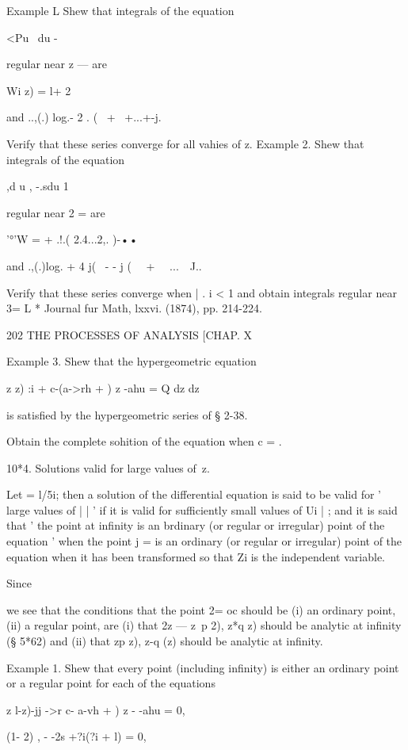 Example L Shew that integrals of the equation

<Pu \ du -

regular near z — are

Wi z) = l+ 2



and ..,(.) log.- 2 . ( \ + \ +...+-j.

Verify that these series converge for all vahies of z. Example 2. Shew
that integrals of the equation

 ,d u , -.sdu 1

regular near 2 = are

'°'W = + .!.( 2.4...2,. )-••

and .,(.)log. + 4 j( \ - - j ( \ \ + \ \ ...\ \ J..

Verify that these series converge when | . i < 1 and obtain integrals
regular near 3= L * Journal fur Math, lxxvi. (1874), pp. 214-224.



202 THE PROCESSES OF ANALYSIS [CHAP. X

Example 3. Shew that the hypergeometric equation

z z) :i + c-(a->rh + ) z -ahu = Q dz dz

is satisfied by the hypergeometric series of § 2-38.

Obtain the complete sohition of the equation when c = .

10*4. Solutions valid for large values of\ z.

Let = l/5i; then a solution of the differential equation is said to be
valid for ' large values of | | ' if it is valid for sufficiently
small values of Ui | ; and it is said that ' the point at infinity is
an brdinary (or regular or irregular) point of the equation ' when the
point j = is an ordinary (or regular or irregular) point of the
equation when it has been transformed so that Zi is the independent
variable.

Since

we see that the conditions that the point 2= oc should be (i) an
ordinary point, (ii) a regular point, are (i) that 2z — z~p 2), z*q z)
should be analytic at infinity (§ 5*62) and (ii) that zp z), z-q (z)
should be analytic at infinity.

Example 1. Shew that every point (including infinity) is either an
ordinary point or a regular point for each of the equations

z l-z)-jj ->r c- a-vh + ) z - -ahu = 0,

(1- 2) , - -2s +?i(?i + l) = 0,

